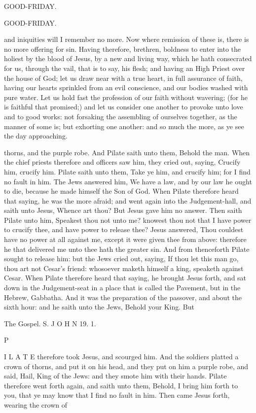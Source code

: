 GOOD-FRIDAY.

GOOD-FRIDAY.

and iniquities will I remember no more. Now where remission of these is, there is no more offering for sin. Having therefore, brethren, boldness to enter into the holiest by the blood of Jesus, by a new and living way, which he hath consecrated for us, through the vail, that is to say, his flesh; and having an High Priest over the house of God; let us draw near with a true heart, in full assurance of faith, having our hearts sprinkled from an evil conscience, and our bodies washed with pure water. Let us hold fast the profession of our faith without wavering; (for he is faithful that promised;) and let us consider one another to provoke unto love and to good works: not forsaking the assembling of ourselves together, as the manner of some is; but exhorting one another: and so much the more, as ye see the day approaching.

thorns, and the purple robe. And Pilate saith unto them, Behold the man. When the chief priests therefore and officers saw him, they cried out, saying, Crucify him, crucify him. Pilate saith unto them, Take ye him, and crucify him; for I find no fault in him. The Jews answered him, We have a law, and by our law he ought to die, because he made himself the Son of God. When Pilate therefore heard that saying, he was the more afraid; and went again into the Judgement-hall, and saith unto Jesus, Whence art thou? But Jesus gave him no answer. Then saith Pilate unto him, Speakest thou not unto me? knowest thou not that I have power to crucify thee, and have power to release thee? Jesus answered, Thou couldest have no power at all against me, except it were given thee from above: therefore he that delivered me unto thee hath the greater sin. And from thenceforth Pilate sought to release him: but the Jews cried out, saying, If thou let this man go, thou art not Cesar’s friend: whosoever maketh himself a king, speaketh against Cesar. When Pilate therefore heard that saying, he brought Jesus forth, and sat down in the Judgement-seat in a place that is called the Pavement, but in the Hebrew, Gabbatha. And it was the preparation of the passover, and about the sixth hour: and he saith unto the Jews, Behold your King. But

The Gospel. S. J O H N 19. 1.

P

I L A T E therefore took Jesus, and scourged him. And the soldiers platted a crown of thorns, and put it on his head, and they put on him a purple robe, and said, Hail, King of the Jews: and they smote him with their hands. Pilate therefore went forth again, and saith unto them, Behold, I bring him forth to you, that ye may know that I find no fault in him. Then came Jesus forth, wearing the crown of

